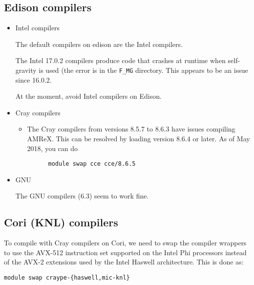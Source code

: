 
\subsection{Edison compilers}

\begin{itemize}
\item Intel compilers

  The default compilers on edison are the Intel compilers.  

  The Intel 17.0.2 compilers produce code that crashes at runtime when self-gravity
  is used (the error is in the {\tt F\_MG} directory.  This appears to be an issue since
  16.0.2.

  At the moment, avoid Intel compilers on Edison.


\item Cray compilers

  \begin{itemize}

    \item The Cray compilers from versions 8.5.7 to 8.6.3 have issues compiling AMReX. This
    can be resolved by loading version 8.6.4 or later. As of May 2018, you can do
    \begin{verbatim}
      module swap cce cce/8.6.5
    \end{verbatim}
   \end{itemize}
\item GNU

  The GNU compilers (6.3) seem to work fine.

\end{itemize}


\subsection{Cori (KNL) compilers}

To compile with Cray compilers on Cori, we need to swap the compiler
wrappers to use the AVX-512 instruction set supported on the Intel Phi
processors instead of the AVX-2 extensions used by the Intel Haswell
architecture.  This is done as:
\begin{verbatim}
module swap craype-{haswell,mic-knl}
\end{verbatim}

